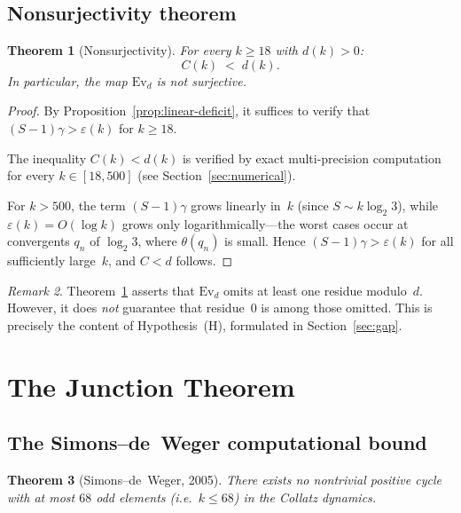 \documentclass[12pt, a4paper]{amsart}
\theoremstyle{plain}
\newtheorem{theorem}{Theorem}[section]
\theoremstyle{definition}
\theoremstyle{remark}
\newtheorem{remark}[theorem]{Remark}
\newcommand{\Ev}{\mathrm{Ev}}
\begin{document}
\subsection{Nonsurjectivity theorem}

\begin{theorem}[Nonsurjectivity]\label{thm:nonsurj}
  For every $k \geq 18$ with $d(k) > 0$:
  \[
    C(k) \;<\; d(k).
  \]
  In particular, the map $\Ev_d$ is not surjective.
\end{theorem}

\begin{proof}
  By Proposition~\ref{prop:linear-deficit}, it suffices to
  verify that $(S-1)\gamma > \varepsilon(k)$ for $k \geq 18$.

  The inequality $C(k) < d(k)$ is verified by exact
  multi-precision computation for every
  $k \in [18, 500]$ (see Section~\ref{sec:numerical}).

  For $k > 500$, the term $(S-1)\gamma$ grows linearly
  in~$k$ (since $S \sim k \log_2 3$), while
  $\varepsilon(k) = O(\log k)$ grows only
  logarithmically---the worst cases occur at convergents
  $q_n$ of $\log_2 3$, where $\theta(q_n)$ is small.
  Hence $(S-1)\gamma > \varepsilon(k)$ for all
  sufficiently large~$k$, and $C < d$ follows.
\end{proof}

\begin{remark}\label{rem:nonsurj-meaning}
  Theorem~\ref{thm:nonsurj} asserts that $\Ev_d$ omits at
  least one residue modulo~$d$. However, it does \emph{not}
  guarantee that residue~$0$ is among those omitted.
  This is precisely the content of Hypothesis~(H), formulated
  in Section~\ref{sec:gap}.
\end{remark}

\section{The Junction Theorem}\label{sec:junction}

\subsection{The Simons--de~Weger computational bound}

\begin{theorem}[Simons--de~Weger, 2005]\label{thm:sdw}
  There exists no nontrivial positive cycle with at most
  $68$ odd elements (i.e.\ $k \leq 68$) in the Collatz
  dynamics.
\end{theorem}
\end{document}
